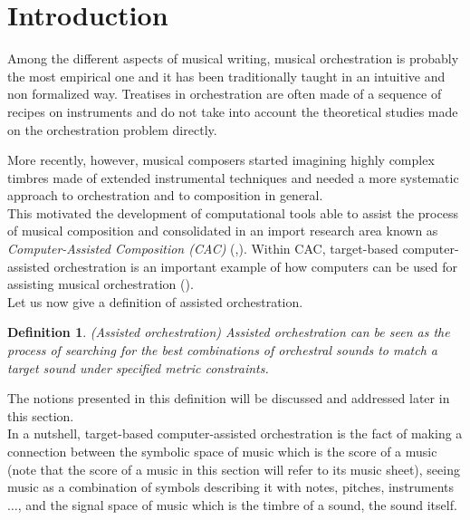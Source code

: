 \documentclass[a4paper]{book}
\newtheorem{definition}{Definition}
\begin{document}
\section{Introduction}\label{sec:introduction}

Among the different aspects of musical writing, musical orchestration is probably the most empirical one and it has been traditionally taught in an intuitive and non formalized way. Treatises in orchestration are often made of a sequence of recipes on instruments and do not take into account the theoretical studies made on the orchestration problem directly.

More recently, however, musical composers started imagining highly complex timbres made of extended instrumental techniques and needed a more systematic approach to orchestration and to composition in general. \\

This motivated the development of computational tools able to assist the process of musical composition and consolidated in an import research area known as \textit{Computer-Assisted Composition (CAC)} (\cite{fernandez2013ai},\cite{ariza2005navigating}). Within CAC, target-based computer-assisted orchestration is an important example of how computers can be used for assisting musical orchestration (\cite{maresz2013computer}).\\

Let us now give a definition of assisted orchestration.
\begin{definition}{\emph{(Assisted orchestration)}}
Assisted orchestration can be seen as the process of searching for the best combinations of orchestral sounds to match a target sound under specified metric constraints.
\end{definition}

The notions presented in this definition will be discussed and addressed later in this section.\\


In a nutshell, target-based computer-assisted orchestration is the fact of making a connection between the symbolic space of music which is the score of a music (note that the score of a music in this section will refer to its music sheet), seeing music as a combination of symbols describing it with notes, pitches, instruments $\ldots$, and the signal space of music which is the timbre of a sound, the sound itself. 
\end{document}

